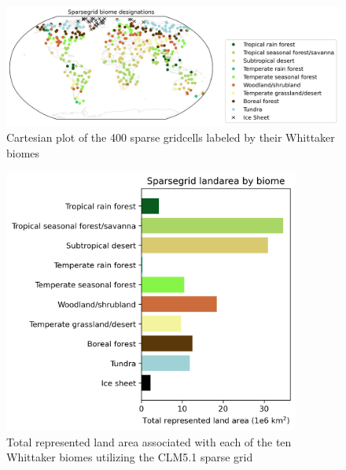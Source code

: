 \documentclass[11pt]{article}
\begin{document}
\begin{figure}[h]
\centering
\includegraphics[width=40pc]{figs/supp/biome_latlon.png}
\caption{Cartesian plot of the 400 sparse gridcells labeled by their Whittaker biomes}
\label{supp:whit2}
\end{figure}


\begin{figure}[h]
\centering
\includegraphics[width=23pc]{figs/supp/biome_areas.png}
\caption{Total represented land area associated with each of the ten Whittaker biomes utilizing the CLM5.1 sparse grid}
\label{supp:whit3}
\end{figure}
\end{document}
